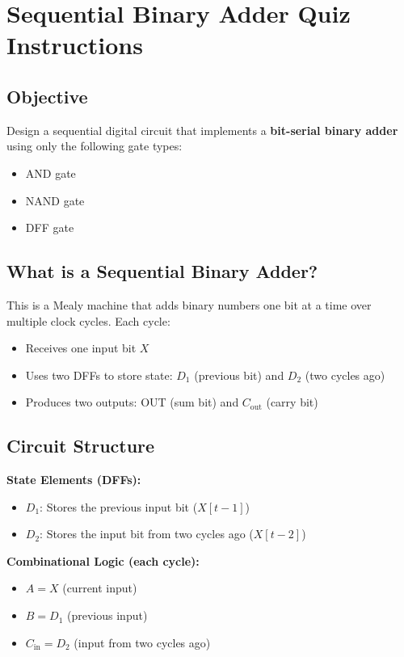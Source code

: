 \section*{Sequential Binary Adder Quiz Instructions}

\subsection*{Objective}
Design a sequential digital circuit that implements a \textbf{bit-serial binary adder} using only the following gate types:
\begin{itemize}
  \item AND gate
  \item NAND gate
  \item DFF gate
\end{itemize}

\subsection*{What is a Sequential Binary Adder?}
This is a Mealy machine that adds binary numbers one bit at a time over multiple clock cycles. Each cycle:
\begin{itemize}
  \item Receives one input bit $X$
  \item Uses two DFFs to store state: $D_1$ (previous bit) and $D_2$ (two cycles ago)
  \item Produces two outputs: OUT (sum bit) and $C_{\text{out}}$ (carry bit)
\end{itemize}

\subsection*{Circuit Structure}
\textbf{State Elements (DFFs):}
\begin{itemize}
  \item $D_1$: Stores the previous input bit ($X[t-1]$)
  \item $D_2$: Stores the input bit from two cycles ago ($X[t-2]$)
\end{itemize}

\textbf{Combinational Logic (each cycle):}
\begin{itemize}
  \item $A = X$ (current input)
  \item $B = D_1$ (previous input)
  \item $C_{\text{in}} = D_2$ (input from two cycles ago)
\end{itemize}

